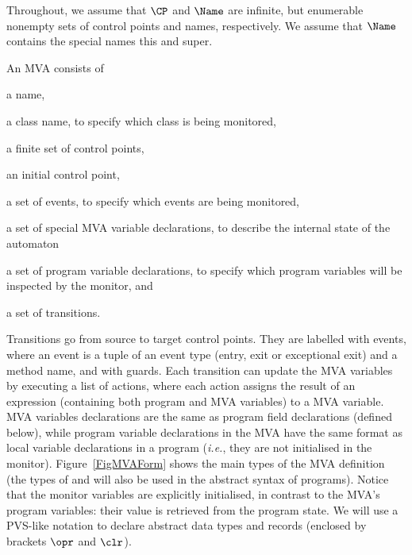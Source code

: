 Throughout, we assume that \(\CP\) and \(\Name\) are infinite, but
enumerable nonempty sets of control points and names, respectively. We
assume that \(\Name\) contains the special names \textsf{this} and
\textsf{super}.


An MVA consists of
\begin{inparaenum}
\item a name,
\item a class name, to specify which class is being monitored,
\item a finite set of control points,
\item an initial control point,
\item a set of events, to specify which events are being monitored,
\item a set of special MVA variable declarations, to describe
the internal state of the automaton
\item a set of program variable declarations, to specify which
program variables will be inspected by the monitor, and
\item a set of transitions.
\end{inparaenum}
Transitions go from source to target control points. They are labelled
with events, where an event is a tuple of an event type (entry, exit
or exceptional exit) and a method name, and with guards. Each
transition can update the MVA variables by executing a list of
actions, where each action assigns the result of an expression
(containing both program and MVA variables) to a MVA variable. MVA
variables declarations are the same as program field declarations
(defined below), while program variable declarations in the MVA have
the same format as local variable declarations in a program
(\emph{i.e.}, they are not initialised in the
monitor). Figure~\ref{FigMVAForm} shows the main types of the MVA
definition (the types of \FieldDecl and \LocalVarDecl will also be
used in the abstract syntax of programs).  Notice that the monitor
variables are explicitly initialised, in contrast to the MVA's program
variables: their value is retrieved from the program state.  We will
use a PVS-like notation to declare abstract data types and records
(enclosed by brackets \(\opr\) and \(\clr\)).

